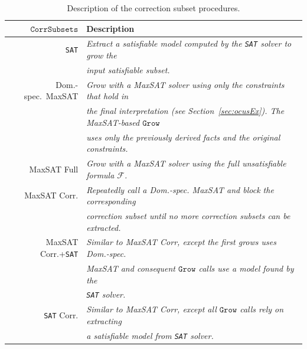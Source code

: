 \documentclass[a4paper,UKenglish,cleveref, autoref, thm-restate, pdfa]{lipics-v2021}
\newcommand\mm[1]{\ensuremath{#1}\xspace}
\newcommand\call[1]{\mm{\texttt{#1}}}
\newcommand\sat{\texttt{{SAT}}\xspace}
\newcommand\grow{\mm{\call{Grow}}}
\newcommand\corrsubsets{\mm{\call{CorrSubsets}}}
\newcommand\maxsat{MaxSAT\xspace}
\begin{document}
			\begin{table}[!h]
				\centering	
					\begin{tabular}{|r|l|}
						\hline
						\textbf{\corrsubsets}  &  \textbf{Description}\\\hline
						\sat & \textit{Extract a satisfiable model computed by the \sat solver to grow the} \\
						& \textit{input satisfiable subset.} \\\hline
						Dom.-spec.~\maxsat & \textit{Grow with a \maxsat solver using only the constraints that hold in}\\
						&  \textit{the final interpretation (see Section~\ref{sec:ocusEx}). The \maxsat-based \grow}\\ 
						& \textit{uses only the previously derived facts and the original constraints.}\\\hline
						MaxSAT Full & \textit{Grow with a \maxsat solver using the full unsatisfiable formula $\mathcal{F}$.} \\\hline
						\maxsat Corr.& \textit{Repeatedly call a \emph{Dom.-spec. \maxsat} and block the corresponding}\\ 
						& \textit{correction subset until no more correction subsets can be extracted.}\\\hline
						\maxsat Corr.+\sat & \textit{Similar to \emph{\maxsat Corr}, except the first grows uses \emph{Dom.-spec.}}\\
						& \textit{\emph{\maxsat} and consequent \grow calls use a model found by the}  \\
						&  \textit{\sat solver.}\\\hline 
						\sat Corr. & \textit{Similar to \emph{\maxsat Corr}, except all \grow calls rely on extracting}\\
						&  \textit{a satisfiable model from \sat solver.}\\\hline
					\end{tabular}
				\caption{Description of the correction subset procedures.}
				\label{tab:correction-subset-proc-description}
			\end{table}
\end{document}
